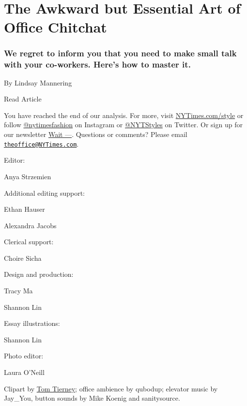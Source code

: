 \href{https://www.nytimes3xbfgragh.onion/2019/09/17/style/the-awkward-art-of-office-small-talk.html}{}

\hypertarget{the-awkward-but-essential-art-of-office-chitchat}{%
\section{The Awkward but Essential Art of Office
Chitchat}\label{the-awkward-but-essential-art-of-office-chitchat}}

\hypertarget{we-regret-to-inform-you-that-you-need-to-make-small-talk-with-your-co-workers-heres-how-to-master-it}{%
\subsubsection{We regret to inform you that you need to make small talk
with your co-workers. Here's how to master
it.}\label{we-regret-to-inform-you-that-you-need-to-make-small-talk-with-your-co-workers-heres-how-to-master-it}}

By Lindsay Mannering

Read Article

You have reached the end of our analysis. For more, visit
\href{https://www.nytimes3xbfgragh.onion/section/style}{NYTimes.com/style}
or follow
\href{https://www.instagram.com/nytimesfashion/}{@nytimesfashion} on
Instagram or \href{https://twitter.com/nytstyles}{@NYTStyles} on
Twitter. Or sign up for our newsletter
\href{https://www.nytimes3xbfgragh.onion/newsletters/wait}{Wait ---}.
Questions or comments? Please email
\href{mailto:theoffice@NYTimes.com}{\nolinkurl{theoffice@NYTimes.com}}.

Editor:

Anya Strzemien

Additional editing support:

Ethan Hauser

Alexandra Jacobs

Clerical support:

Choire Sicha

Design and production:

Tracy Ma

Shannon Lin

Essay illustrations:

Shannon Lin

Photo editor:

Laura O'Neill

Clipart by
\href{https://www.nytimes3xbfgragh.onion/2014/07/19/arts/tom-tierney-who-made-paper-dolls-an-art-form-dies-at-85.html}{Tom
Tierney}; office ambience by qubodup; elevator music by Jay\_You, button
sounds by Mike Koenig and sanitysource.

